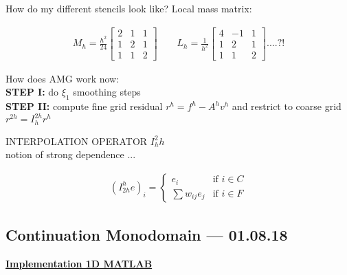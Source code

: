 \documentclass[a4paper, 11pt]{article}
\begin{document}
How do my different stencils look like? Local mass matrix:

\begin{align*}
M_h = \frac{h^2}{24} \begin{bmatrix}
2 & 1 & 1 \\
1 & 2 & 1 \\
1 & 1 & 2
\end{bmatrix} \qquad
L_h = \frac{1}{h^2} \begin{bmatrix}
4 & -1 & 1 \\
1 & 2 & 1 \\
1 & 1 & 2
\end{bmatrix} ....?!
\end{align*}

How does AMG work now: 
\smallskip
\\
\textbf{STEP I:} do $\xi_1$ smoothing steps \\
\textbf{STEP II:} compute fine grid residual $r^h = f^h - A^hv^h$ and restrict to coarse grid $r^{2h} = I_h^{2h}r^h$ 


INTERPOLATION OPERATOR $I_h^2h$ \\

notion of strong dependence ... 

\begin{align*}
(I_{2h}^h e )_i =
\begin{cases}
e_i  & \text{if } i \in C \\
\sum w_{ij} e_j               & \text{if } i \in F
\end{cases}
\end{align*}


\subsection*{Continuation Monodomain --- 01.08.18}

\underline{\textbf{Implementation 1D MATLAB}}
\end{document}
